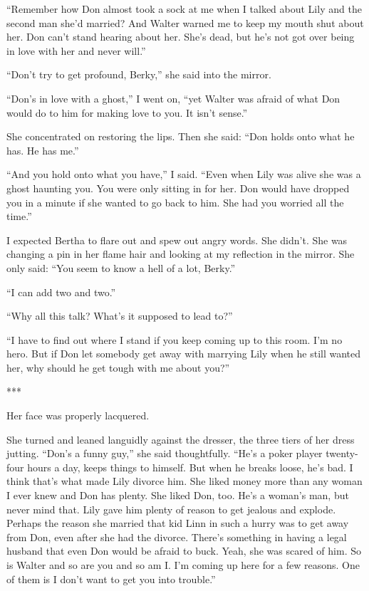 {“Remember how Don almost took a sock at me when I talked about Lily and the second man she’d married? And Walter warned me to keep my mouth shut about her. Don can’t stand hearing about her. She’s dead, but he’s not got over being in love with her and never will.”

“Don’t try to get profound, Berky,” she said into the mirror.

“Don’s in love with a ghost,” I went on, “yet Walter was afraid of what Don would do to him for making love to you. It isn’t sense.”

She concentrated on restoring the lips. Then she said: “Don holds onto what he has. He has me.”

“And you hold onto what you have,” I said. “Even when Lily was alive she was a ghost haunting you. You were only sitting in for her. Don would have dropped you in a minute if she wanted to go back to him. She had you worried all the time.”

I expected Bertha to flare out and spew out angry words. She didn’t. She was changing a pin in her flame hair and looking at my reflection in the mirror. She only said: “You seem to know a hell of a lot, Berky.”

“I can add two and two.”

“Why all this talk? What’s it supposed to lead to?”

“I have to find out where I stand if you keep coming up to this room. I’m no hero. But if Don let somebody get away with marrying Lily when he still wanted her, why should he get tough with me about you?”

***

Her face was properly lacquered.

She turned and leaned languidly against the dresser, the three tiers of her dress jutting. “Don’s a funny guy,” she said thoughtfully. “He’s a poker player twenty-four hours a day, keeps things to himself. But when he breaks loose, he’s bad. I think that’s what made Lily divorce him. She liked money more than any woman I ever knew and Don has plenty. She liked Don, too. He’s a woman’s man, but never mind that. Lily gave him plenty of reason to get jealous and explode. Perhaps the reason she married that kid Linn in such a hurry was to get away from Don, even after she had the divorce. There’s something in having a legal husband that even Don would be afraid to buck. Yeah, she was scared of him. So is Walter and so are you and so am I. I’m coming up here for a few reasons. One of them is I don’t want to get you into trouble.”

}
